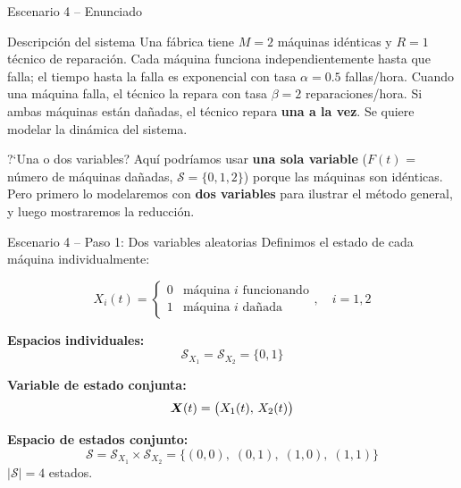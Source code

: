 \documentclass[aspectratio=1610, 9pt]{beamer}
\begin{document}
\begin{frame}{Escenario 4 -- Enunciado}
\begin{exampleblock}{Descripción del sistema}
Una f\'abrica tiene $M=2$ m\'aquinas id\'enticas y $R=1$ t\'ecnico de reparaci\'on. Cada m\'aquina funciona independientemente hasta que falla; el tiempo hasta la falla es exponencial con tasa $\alpha = 0.5$ fallas/hora. Cuando una m\'aquina falla, el t\'ecnico la repara con tasa $\beta = 2$ reparaciones/hora. Si ambas m\'aquinas est\'an da\~nadas, el t\'ecnico repara \textbf{una a la vez}. Se quiere modelar la din\'amica del sistema.
\end{exampleblock}

\vspace{6pt}
\begin{alertblock}{?`Una o dos variables?}
Aqu\'i podr\'iamos usar \textbf{una sola variable} ($F(t)$ = n\'umero de m\'aquinas da\~nadas, $\mathcal{S}=\{0,1,2\}$) porque las m\'aquinas son id\'enticas. Pero primero lo modelaremos con \textbf{dos variables} para ilustrar el m\'etodo general, y luego mostraremos la reducci\'on.
\end{alertblock}
\end{frame}

\begin{frame}{Escenario 4 -- Paso 1: Dos variables aleatorias}
Definimos el estado de cada m\'aquina individualmente:

\[
X_i(t) = \begin{cases} 0 & \text{m\'aquina } i \text{ funcionando} \\ 1 & \text{m\'aquina } i \text{ da\~nada} \end{cases}, \quad i = 1, 2
\]

\vspace{4pt}
\textbf{Espacios individuales:}
\[
\mathcal{S}_{X_1} = \mathcal{S}_{X_2} = \{0, 1\}
\]

\vspace{4pt}
\textbf{Variable de estado conjunta:}
\[
\boldsymbol{X}(t) = \big(X_1(t),\, X_2(t)\big)
\]

\textbf{Espacio de estados conjunto:}
\[
\mathcal{S} = \mathcal{S}_{X_1} \times \mathcal{S}_{X_2} = \{(0,0),\; (0,1),\; (1,0),\; (1,1)\}
\]
\quad $|\mathcal{S}| = 4$ estados.
\end{frame}
\end{document}
